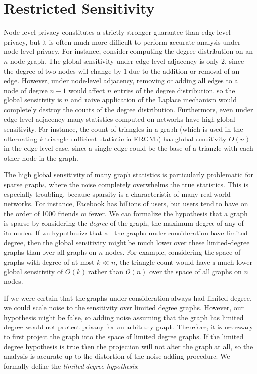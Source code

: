 \section{Restricted Sensitivity}
\label{sec:restricted_sensitivity}

 Node-level privacy constitutes a strictly stronger guarantee than edge-level privacy, but it is often much more difficult to perform accurate analysis under node-level privacy. For instance, consider computing the degree distribution on an $n$-node graph. The global sensitivity under edge-level adjacency is only $2$, since the degree of two nodes will change by $1$ due to the addition or removal of an edge. However, under node-level adjacency, removing or adding all edges to a node of degree $n-1$ would affect $n$ entries of the degree distribution, so the global sensitivity is $n$ and naive application of the Laplace mechanism would completely destroy the counts of the degree distribution. Furthermore, even under edge-level adjacency many statistics computed on networks have high global sensitivity. For instance, the count of triangles in a graph (which is used in the alternating $k$-triangle sufficient statistic in ERGMs) has global sensitivity $O(n)$ in the edge-level case, since a single edge could be the base of a triangle with each other node in the graph.
 
 The high global sensitivity of many graph statistics is particularly problematic for sparse graphs, where the noise completely overwhelms the true statistics. This is especially troubling, because sparsity is a characteristic of many real world networks. For instance, Facebook has billions of users, but  users tend to have on the order of 1000 friends or fewer. We can formalize the hypothesis that a graph is sparse by considering the \emph{degree} of the graph, the maximum degree of any of its nodes. If we hypothesize that all the graphs under consideration have limited degree, then the global sensitivity might be much lower over these limited-degree graphs than over all graphs on $n$ nodes. For example, considering the space of graphs with degree of at most $k \ll n$, the triangle count would have a much lower global sensitivity of $O(k)$ rather than $O(n)$ over the space of all graphs on $n$ nodes.
 
 If we were certain that the graphs under consideration always had limited degree, we could scale noise to the sensitivity over limited degree graphs. However, our hypothesis might be false, so adding noise assuming that the graph has limited degree would not protect privacy for an arbitrary graph.  Therefore, it is necessary to first project the graph into the space of limited degree graphs. If the limited degree hypothesis is true then the projection will not alter the graph at all, so the analysis is accurate up to the distortion of the noise-adding procedure. We formally define the \emph{limited degree hypothesis}:
 
